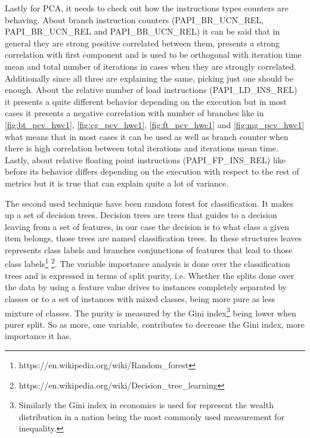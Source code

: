 Lastly for PCA, it needs to check out how the instructions types counters are
behaving. About branch instruction counters (PAPI\_BR\_UCN\_REL,
PAPI\_BR\_UCN\_REL and PAPI\_BR\_UCN\_REL) it can be said that in general they
are strong positive correlated between them, presents a strong
correlation with first component and is used to be orthogonal with iteration
time mean and total number of iterations in cases when they are strongly
correlated. 
Additionally since all three are explaining the same, picking just one
should be enough. About the relative number of load instructions 
(PAPI\_LD\_INS\_REL) it presents a quite different behavior depending on the
execution but in most cases it presents a negative correlation with number of
branches like in \ref{fig:bt_pcv_hwc1}, \ref{fig:cg_pcv_hwc1},
\ref{fig:ft_pcv_hwc1} and \ref{fig:mg_pcv_hwc1} what means that in most cases it
can be used as well as branch counter when there is high correlation between
total iterations and iterations mean time. Lastly, about relative floating
point instructions (PAPI\_FP\_INS\_REL) like before its behavior differs
depending on the execution with respect to the rest of metrics but it is true 
that can explain quite a lot of variance.

The second used technique have been random forest for classification. It makes
up a set of decision trees.
Decision trees are trees that guides to a decision leaving
from a set of features, in our case the decision is to what class a given item
belongs, those trees are named classification trees. In these structures leaves
represents class labels and branches conjunctions of features that lead to those
class labels\footnote{https://en.wikipedia.org/wiki/Random\_forest}
\footnote{https://en.wikipedia.org/wiki/Decision\_tree\_learning}. The variable
importance analysis is done over the classification trees and is expressed in
terms of split purity, i.e. Whether the splits done over the data by using a
feature value drives to instances completely separated by classes or to a set of
instances with mixed classes, being more pure as less mixture of classes. The
purity is measured by the Gini index\footnote{Similarly the Gini index in
economics is used for represent the wealth distribution in a nation being the
most commonly used measurement for inequality.} being lower when purer split. So
as more, one variable, contributes to decrease the Gini index, more importance
it has.


